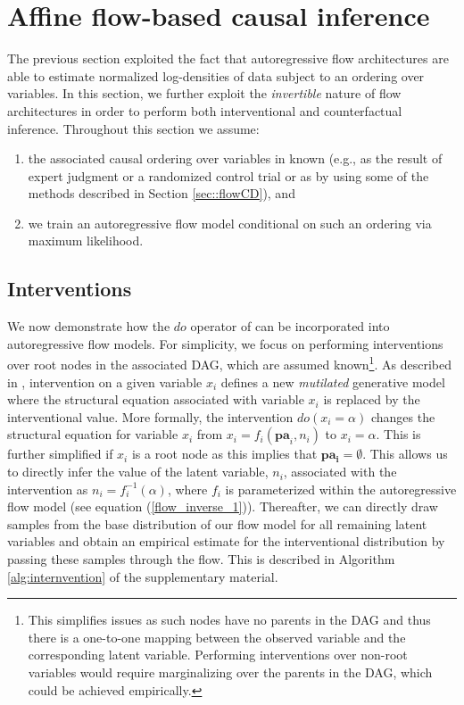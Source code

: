 \documentclass{article}
\begin{document}
\section{Affine flow-based causal inference}
\label{sec::flowCI}

The previous section exploited the fact that autoregressive flow architectures are able to estimate
normalized log-densities of data subject to an ordering over variables.  
In this section, we further exploit the \textit{invertible} nature of flow architectures in 
order to perform both interventional and counterfactual inference. 
%
Throughout this section we assume:
\begin{enumerate}%
	\item the associated causal ordering over variables in known (e.g.,  as the
	result of expert judgment or a randomized control trial or as by using some of the methods 
	described in Section \ref{sec::flowCD}), and 
	\item we train an autoregressive flow model conditional on such an ordering via maximum likelihood.
\end{enumerate}

\subsection*{Interventions}

We now demonstrate how the $do$ operator of \cite{Pearl2009}
can be  incorporated into autoregressive flow models. 
For simplicity, we focus on performing interventions over root nodes in the associated 
DAG, which are assumed known\footnote{This simplifies issues as such nodes have no parents in the DAG and thus there is a one-to-one mapping between the observed variable and 
	the corresponding latent variable. Performing interventions over non-root variables
	would require marginalizing over the parents in the DAG, which could be achieved empirically.}. 
As described in \cite{Pearl2009}, %
intervention on a given variable $x_i$ defines a new 
\textit{mutilated} generative model where
the structural equation associated with variable $x_i$ is replaced by the interventional value.
More formally, the intervention $do( x_i = \alpha)$ changes the structural equation for variable 
$x_i$ from $x_i = f_i( \mathbf{pa}_i, n_i)$ to $x_i = \alpha$. 
This is further simplified if $x_i$ is a root node as this implies that $\mathbf{pa_i} = \emptyset$. 
This allows us to directly infer the value of the
latent variable, $n_i$, associated with the intervention as
$n_i = f_i^{-1}(  \alpha)$, where $f_i$ is parameterized within the 
autoregressive flow model (see equation (\ref{flow_inverse_1})). Thereafter, we can directly draw samples from 
the base distribution of our flow model for all remaining latent variables and obtain an 
empirical estimate for the interventional distribution by passing
these samples through the flow. This is described in Algorithm \ref{alg:internvention} of the supplementary material. 
\end{document}
